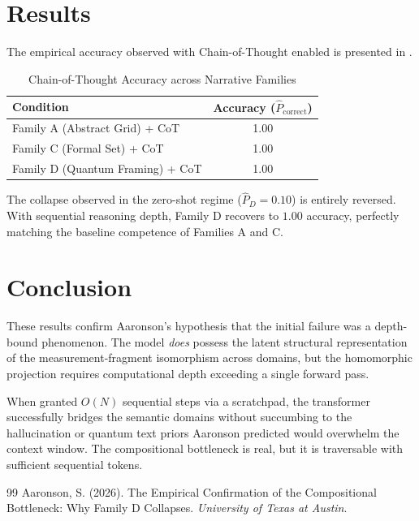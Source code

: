 \documentclass[12pt,a4paper]{article}
\begin{document}
\section{Results}
The empirical accuracy observed with Chain-of-Thought enabled is presented in .

\begin{table}[ht]
\centering
\caption{Chain-of-Thought Accuracy across Narrative Families}
\label{tab:cot_recovery}
\begin{tabular}{lc}
\toprule
\textbf{Condition} & \textbf{Accuracy ($\hat{P}_{\text{correct}}$)} \\
\midrule
Family A (Abstract Grid) + CoT & 1.00 \\
Family C (Formal Set) + CoT & 1.00 \\
Family D (Quantum Framing) + CoT & 1.00 \\
\bottomrule
\end{tabular}
\end{table}

The collapse observed in the zero-shot regime ($\hat{P}_D = 0.10$) is entirely reversed. With sequential reasoning depth, Family D recovers to $1.00$ accuracy, perfectly matching the baseline competence of Families A and C.

\section{Conclusion}
These results confirm Aaronson's hypothesis that the initial failure was a depth-bound phenomenon. The model \emph{does} possess the latent structural representation of the measurement-fragment isomorphism across domains, but the homomorphic projection requires computational depth exceeding a single forward pass.

When granted $O(N)$ sequential steps via a scratchpad, the transformer successfully bridges the semantic domains without succumbing to the hallucination or quantum text priors Aaronson predicted would overwhelm the context window. The compositional bottleneck is real, but it is traversable with sufficient sequential tokens.

\begin{thebibliography}{99}
 Aaronson, S. (2026). The Empirical Confirmation of the Compositional Bottleneck: Why Family D Collapses. \emph{University of Texas at Austin}.
\end{thebibliography}
\end{document}
